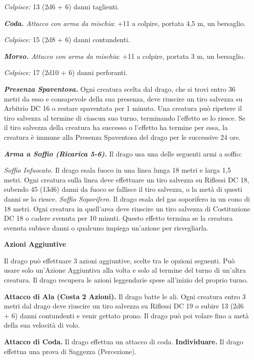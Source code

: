 \begin{multicols}{2}
\emph{Colpisce:} 13 (2d6 + 6) danni taglienti.

\emph{\textbf{Coda.} Attacco con arma da mischia}: +11 a colpire,
portata 4,5 m, un bersaglio.

\emph{Colpisce:} 15 (2d8 + 6) danni contundenti.

\emph{\textbf{Morso.} Attacco con arma da mischia}: +11 a colpire,
portata 3 m, un bersaglio.

\emph{Colpisce:} 17 (2d10 + 6) danni perforanti.

\emph{\textbf{Presenza Spaventosa.}} Ogni creatura scelta dal drago, che
si trovi entro 36 metri da esso e consapevole della sua presenza, deve
riuscire un tiro salvezza su Arbitrio DC 16 o restare spaventata per 1
minuto. Una creatura può ripetere il tiro salvezza al termine di ciascun
suo turno, terminando l'effetto se lo riesce. Se il tiro salvezza della
creatura ha successo o l'effetto ha termine per essa, la creatura è
immune alla Presenza Spaventosa del drago per le successive 24 ore.

\emph{\textbf{Arma a Soffio (Ricarica 5-6).}} Il drago usa una delle
seguenti armi a soffio:

\emph{Soffio Infuocato.} Il drago esala fuoco in una linea lunga 18
metri e larga 1,5 metri. Ogni creatura sulla linea deve effettuare un
tiro salvezza su Riflessi DC 18, subendo 45 (13d6) danni da fuoco se
fallisce il tiro salvezza, o la metà di questi danni se lo riesce.
\emph{Soffio Soporifero.} Il drago esala del gas soporifero in un cono
di 18 metri. Ogni creatura in quell'area deve riuscire un tiro salvezza
di Costituzione DC 18 o cadere svenuta per 10 minuti. Questo effetto
termina se la creatura svenuta subisce danni o qualcuno impiega
un'azione per risvegliarla.

\textbf{Azioni Aggiuntive}

Il drago può effettuare 3 azioni aggiuntive, scelte tra le opzioni
seguenti. Può usare solo un'Azione Aggiuntiva alla volta e solo al
termine del turno di un'altra creatura. Il drago recupera le azioni
leggendarie spese all'inizio del proprio turno.

\textbf{Attacco di Ala (Costa 2 Azioni).} Il drago batte le ali. Ogni
creatura entro 3 metri dal drago deve riuscire un tiro salvezza su Riflessi DC 19 o subire 13 (2d6 + 6) danni contundenti e venir gettato
prono. Il drago può poi volare fino a metà della sua velocità di volo.

\textbf{Attacco di Coda.} Il drago effettua un attacco di coda.
\textbf{Individuare.} Il drago effettua una prova di Saggezza
(Percezione).




\end{multicols}
